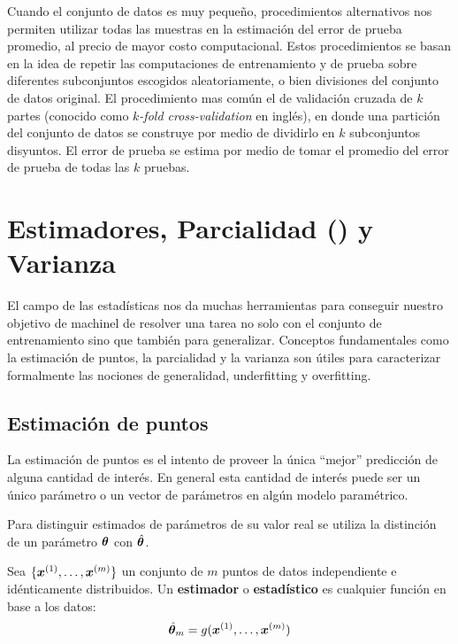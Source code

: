 Cuando el conjunto de datos es muy pequeño, procedimientos alternativos nos permiten utilizar todas las muestras en la estimación del error de prueba promedio, al precio de mayor costo computacional. Estos procedimientos se basan en la idea de repetir las computaciones de entrenamiento y de prueba sobre diferentes subconjuntos escogidos aleatoriamente, o bien divisiones del conjunto de datos original. El procedimiento mas común el de validación cruzada de $k$ partes (conocido como \textsl{$k$-fold cross-validation} en inglés), en donde una partición del conjunto de datos se construye por medio de dividirlo en $k$ subconjuntos disyuntos. El error de prueba se estima por medio de tomar el promedio del error de prueba de todas las $k$ pruebas.


\section{Estimadores, Parcialidad () y Varianza}
El campo de las estadísticas nos da muchas herramientas para conseguir nuestro objetivo de \gls{machinel} de resolver una tarea no solo con el conjunto de entrenamiento sino que también para generalizar. Conceptos fundamentales como la estimación de puntos, la parcialidad y la varianza son útiles para caracterizar formalmente las nociones de generalidad, \gls{underfitting} y \gls{overfitting}.

\subsection{Estimación de puntos}
La estimación de puntos es el intento de proveer la única ``mejor'' predicción de alguna cantidad de interés. En general esta cantidad de interés puede ser un único parámetro o un vector de parámetros en algún modelo paramétrico.

Para distinguir estimados de parámetros de su valor real se utiliza la distinción de un parámetro ${\bm{\theta}}$ con $\hat{{\bm{\theta}}}$.

Sea $\{ {\bm{x}}^{(1)}, \ldots, {\bm{x}}^{(m)} \}$ un conjunto de $m$ puntos de datos independiente e idénticamente distribuidos. Un \textbf{estimador} o \textbf{estadístico} es cualquier función en base a los datos:
\begin{equation}
  \hat{{\bm{\theta}}}_m = g( {\bm{x}}^{(1)}, \ldots, {\bm{x}}^{(m)} )
\end{equation}

